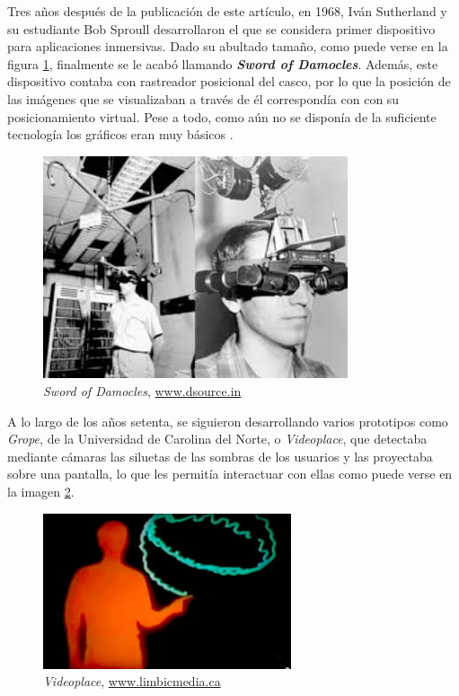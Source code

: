 Tres años después de la publicación de este artículo, en 1968, Iván Sutherland y su estudiante Bob Sproull desarrollaron el que se considera primer dispositivo para aplicaciones inmersivas. Dado su abultado tamaño, como puede verse en la figura \ref{fig:damocles}, finalmente se le acabó llamando \textbf{\textit{Sword of Damocles}}. Además, este dispositivo contaba con rastreador posicional del casco, por lo que la posición de las imágenes que se visualizaban a través de él correspondía con con su posicionamiento virtual. Pese a todo, como aún no se disponía de la suficiente tecnología los gráficos eran muy básicos \cite{lop-18}.

\vspace{0.1cm}

\begin{figure}[!h]
    \begin{center}
        \includegraphics[width=0.8\textwidth]{imagenes/2/damocles.jpg}
        \caption{\textit{Sword of Damocles}, \url{www.dsource.in}}
        \label{fig:damocles}
    \end{center}
\end{figure}

A lo largo de los años setenta, se siguieron desarrollando varios prototipos como \textit{Grope}, de la Universidad de Carolina del Norte, o \textit{Videoplace}, que detectaba mediante cámaras las siluetas de las sombras de los usuarios y las proyectaba sobre una pantalla, lo que les permitía interactuar con ellas \cite{gerv-99} como puede verse en la imagen \ref{fig:videoplace}.

\begin{figure}[H]
    \begin{center}
        \includegraphics[width=0.65\textwidth]{imagenes/2/videoplace.jpg}
        \caption{\textit{Videoplace}, \url{www.limbicmedia.ca}}
        \label{fig:videoplace}
    \end{center}
\end{figure}


